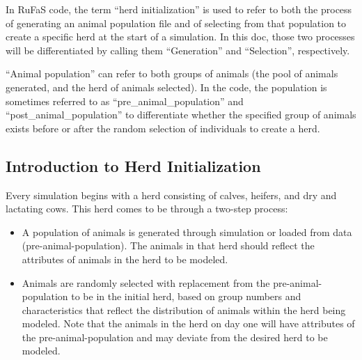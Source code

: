 \documentclass[
  letterpaper,
  oneside,
  openany]{scrbook}
\providecommand{\tightlist}{%
  \setlength{\itemsep}{0pt}\setlength{\parskip}{0pt}}
\begin{document}
\begin{tcolorbox}[enhanced jigsaw, arc=.35mm, bottomrule=.15mm, bottomtitle=1mm, breakable, colback=white, colbacktitle=quarto-callout-note-color!10!white, colframe=quarto-callout-note-color-frame, coltitle=black, left=2mm, leftrule=.75mm, opacityback=0, opacitybacktitle=0.6, rightrule=.15mm, title=\textcolor{quarto-callout-note-color}{\faInfo}\hspace{0.5em}{Note}, titlerule=0mm, toprule=.15mm, toptitle=1mm]

In RuFaS code, the term ``herd initialization'' is used to refer to both
the process of generating an animal population file and of selecting
from that population to create a specific herd at the start of a
simulation. In this doc, those two processes will be differentiated by
calling them ``Generation'' and ``Selection'', respectively.

``Animal population'' can refer to both groups of animals (the pool of
animals generated, and the herd of animals selected). In the code, the
population is sometimes referred to as ``pre\_animal\_population'' and
``post\_animal\_population'' to differentiate whether the specified
group of animals exists before or after the random selection of
individuals to create a herd.

\end{tcolorbox}

\subsection{Introduction to Herd
Initialization}\label{introduction-to-herd-initialization}

Every simulation begins with a herd consisting of calves, heifers, and
dry and lactating cows. This herd comes to be through a two-step
process:

\begin{itemize}
\tightlist
\item
  A population of animals is generated through simulation or loaded from
  data (pre-animal-population). The animals in that herd should reflect
  the attributes of animals in the herd to be modeled.
\item
  Animals are randomly selected with replacement from the
  pre-animal-population to be in the initial herd, based on group
  numbers and characteristics that reflect the distribution of animals
  within the herd being modeled. Note that the animals in the herd on
  day one will have attributes of the pre-animal-population and may
  deviate from the desired herd to be modeled.
\end{itemize}
\end{document}
